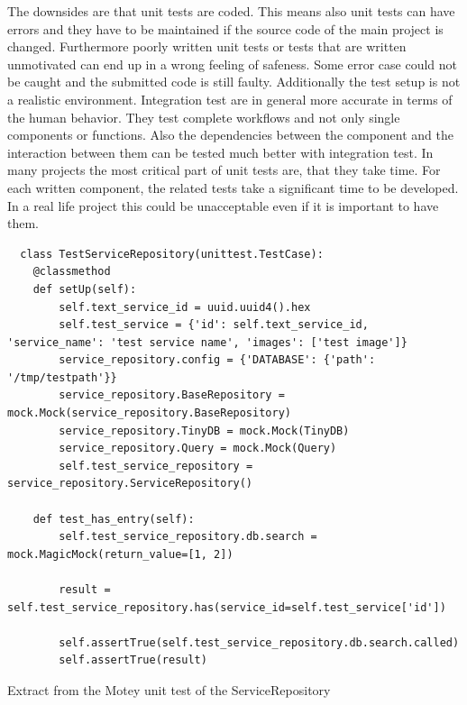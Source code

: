 The downsides are that unit tests are coded.
This means also unit tests can have errors and they have to be maintained if the source code of the main project is changed.
Furthermore poorly written unit tests or tests that are written unmotivated can end up in a wrong feeling of safeness.
Some error case could not be caught and the submitted code is still faulty.
Additionally the test setup is not a realistic environment.
Integration test are in general more accurate in terms of the human behavior.
They test complete workflows and not only single components or functions.
Also the dependencies between the component and the interaction between them can be tested much better with integration test.
In many projects the most critical part of unit tests are, that they take time.
For each written component, the related tests take a significant time to be developed.
In a real life project this could be unacceptable even if it is important to have them.\newline

\begin{listing}[H]
  \begin{verbatim}
  class TestServiceRepository(unittest.TestCase):
    @classmethod
    def setUp(self):
        self.text_service_id = uuid.uuid4().hex
        self.test_service = {'id': self.text_service_id, 'service_name': 'test service name', 'images': ['test image']}
        service_repository.config = {'DATABASE': {'path': '/tmp/testpath'}}
        service_repository.BaseRepository = mock.Mock(service_repository.BaseRepository)
        service_repository.TinyDB = mock.Mock(TinyDB)
        service_repository.Query = mock.Mock(Query)
        self.test_service_repository = service_repository.ServiceRepository()

    def test_has_entry(self):
        self.test_service_repository.db.search = mock.MagicMock(return_value=[1, 2])

        result = self.test_service_repository.has(service_id=self.test_service['id'])

        self.assertTrue(self.test_service_repository.db.search.called)
        self.assertTrue(result)
  \end{verbatim}
  \caption{Extract from the Motey unit test of the ServiceRepository}
  \label{code:sample_unit_test}
\end{listing}

